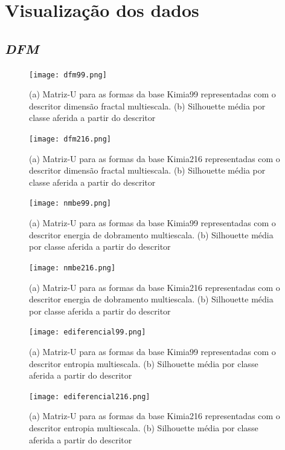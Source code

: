 \section{Visualização dos dados}

\subsection{\emph{DFM}}

\begin{figure}
 \caption{\label{fig:dfm99} (a) Matriz-U para as formas da base Kimia99 representadas com o descritor dimensão fractal multiescala. (b) Silhouette média por classe aferida a partir do descritor}
  \centering
  \texttt{[image: dfm99.png]}
\end{figure}

\begin{figure}
 \caption{\label{fig:dfm216} (a) Matriz-U para as formas da base Kimia216 representadas com o descritor dimensão fractal multiescala. (b) Silhouette média por classe aferida a partir do descritor}
  \centering
  \texttt{[image: dfm216.png]}
\end{figure}

\begin{figure}
 \caption{\label{fig:nmbe99} (a) Matriz-U para as formas da base Kimia99 representadas com o descritor energia de dobramento multiescala. (b) Silhouette média por classe aferida a partir do descritor}
  \centering
  \texttt{[image: nmbe99.png]}
\end{figure}

\begin{figure}
 \caption{\label{fig:nmbe216} (a) Matriz-U para as formas da base Kimia216 representadas com o descritor energia de dobramento multiescala. (b) Silhouette média por classe aferida a partir do descritor}
  \centering
  \texttt{[image: nmbe216.png]}
\end{figure}

\begin{figure}
 \caption{\label{fig:edif99} (a) Matriz-U para as formas da base Kimia99 representadas com o descritor entropia multiescala. (b) Silhouette média por classe aferida a partir do descritor}
  \centering
  \texttt{[image: ediferencial99.png]}
\end{figure}

\begin{figure}
 \caption{\label{fig:edif216} (a) Matriz-U para as formas da base Kimia216 representadas com o descritor entropia multiescala. (b) Silhouette média por classe aferida a partir do descritor}
  \centering
  \texttt{[image: ediferencial216.png]}
\end{figure}

